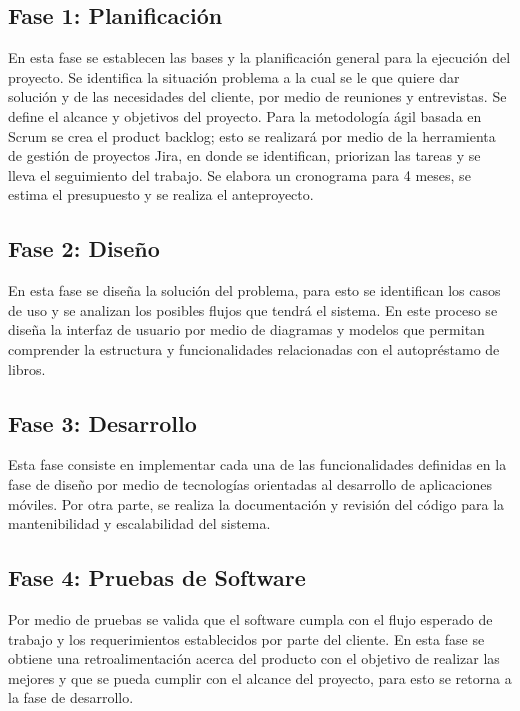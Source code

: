 \documentclass[spanish]{ieee_upb}
\begin{document}
\subsection*{Fase 1: Planificación}

En esta fase se establecen las bases y la planificación general para la ejecución del proyecto. Se identifica la situación problema a la cual se le que quiere dar solución y de las necesidades del cliente, por medio de reuniones y entrevistas. Se define el alcance y objetivos del proyecto. Para la metodología ágil basada en Scrum se crea el product backlog; esto se realizará por medio de la herramienta de gestión de proyectos Jira, en donde se identifican, priorizan las tareas y se lleva el seguimiento del trabajo. Se elabora un cronograma para 4 meses, se estima el presupuesto y se realiza el anteproyecto.

\subsection*{Fase 2: Diseño}

En esta fase se diseña la solución del problema, para esto se identifican los casos de uso y se analizan los posibles flujos que tendrá el sistema. En este proceso se diseña la interfaz de usuario por medio de diagramas y modelos que permitan comprender la estructura y funcionalidades relacionadas con el autopréstamo de libros. 


\subsection*{Fase 3: Desarrollo}

Esta fase consiste en implementar cada una de las funcionalidades definidas en la fase de diseño por medio de tecnologías orientadas al desarrollo de aplicaciones móviles. Por otra parte, se realiza la documentación y revisión del código para la mantenibilidad y escalabilidad del sistema. 

\subsection*{Fase 4: Pruebas de Software}

Por medio de pruebas se valida que el software cumpla con el flujo esperado de trabajo y los requerimientos establecidos por parte del cliente. En esta fase se obtiene una retroalimentación acerca del producto con el objetivo de realizar las mejores y que se pueda cumplir con el alcance del proyecto, para esto se retorna a la fase de desarrollo. 
\end{document}

